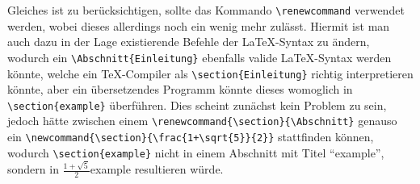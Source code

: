 Gleiches ist zu berücksichtigen, sollte das Kommando \verb|\renewcommand| verwendet werden, wobei dieses allerdings noch ein wenig mehr zulässt. Hiermit ist man auch dazu in der Lage existierende Befehle der \LaTeX{}-Syntax zu ändern, wodurch ein \verb|\Abschnitt{Einleitung}| ebenfalls valide \LaTeX{}-Syntax werden könnte, welche ein \TeX{}-Compiler als \verb|\section{Einleitung}| richtig interpretieren könnte, aber ein übersetzendes Programm könnte dieses womoglich in \verb|\section{example}| überführen. Dies scheint zunächst kein Problem zu sein, jedoch hätte zwischen einem \verb|\renewcommand{\section}{\Abschnitt}| genauso ein \verb|\newcommand{\section}{\frac{1+\sqrt{5}}{2}}| stattfinden können, wodurch \verb|\section{example}| nicht in einem Abschnitt mit Titel \enquote{example}, sondern in $\frac{1+\sqrt{5}}{2}${example} resultieren würde.

